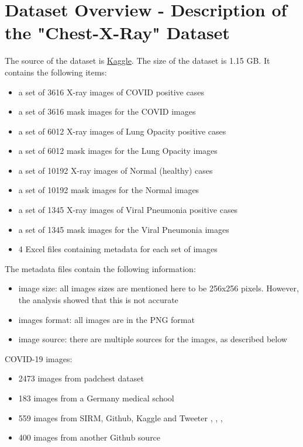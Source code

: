 \documentclass{article}
\begin{document}
\section{Dataset Overview - Description of the "Chest-X-Ray" Dataset} \label{section:data}
The source of the dataset is \href{https://www.kaggle.com/tawsifurrahman/covid19-radiography-database} {Kaggle}. The size of the dataset is 1.15 GB. It contains the following items:
\begin{itemize}
    \item a set of 3616  X-ray images of COVID positive cases
    \item a set of 3616 mask images for the COVID images
    \item a set of 6012  X-ray images of Lung Opacity positive cases
    \item a set of 6012 mask images for the Lung Opacity images
    \item a set of 10192  X-ray images of Normal (healthy) cases
    \item a set of 10192 mask images for the Normal images
    \item a set of 1345  X-ray images of Viral Pneumonia positive cases
    \item a set of 1345 mask images for the Viral Pneumonia images
    \item  4 Excel files containing metadata for each set of images
\end{itemize}

The metadata files contain the following information:
\begin{itemize}
    \item image size: all images sizes are mentioned here to be 256x256 pixels. However, the analysis showed that this is not accurate
    \item images format: all images are in the PNG format
    \item image source: there are multiple sources for the images, as described below
\end{itemize}

COVID-19 images:
\begin{itemize}
    \item 2473 images from padchest dataset \cite{url_1}
    \item 183 images from a Germany medical school \cite{url_2}
    \item 559 images from SIRM, Github, Kaggle and Tweeter \cite{url_3}, \cite{url_4}, \cite{url_5}, \cite{url_6}
    \item 400 images from another Github source \cite{url_7}
\end{itemize}
\end{document}
